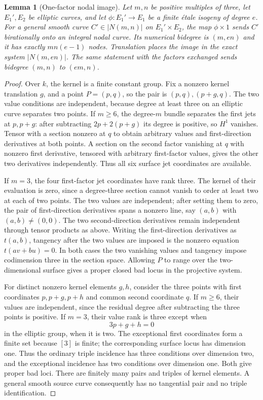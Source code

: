 \documentclass[11pt]{article}
\newtheorem{lemma}[theorem]{Lemma}
\theoremstyle{definition}\newtheorem{definition}[theorem]{Definition}
\theoremstyle{remark}\newtheorem{remark}[theorem]{Remark}
\begin{document}
\begin{lemma}[One-factor nodal image]\label{lem:axis}
Let $m,n$ be positive multiples of three, let $E_1',E_2$ be elliptic curves, and let $\phi:E_1'\to E_1$ be a finite \'etale isogeny of degree $e$. For a general smooth curve $C'\in|N(m,n)|$ on $E_1'\times E_2$, the map $\phi\times1$ sends $C'$ birationally onto an integral nodal curve. Its numerical bidegree is $(m,en)$ and it has exactly $mn(e-1)$ nodes. Translation places the image in the exact system $|N(m,en)|$. The same statement with the factors exchanged sends bidegree $(m,n)$ to $(em,n)$.
\end{lemma}
\begin{proof}
Over $k$, the kernel is a finite constant group. Fix a nonzero kernel translation $g$, and a point $P=(p,q)$, so the pair is $(p,q),(p+g,q)$. The two value conditions are independent, because degree at least three on an elliptic curve separates two points. If $m\ge6$, the degree-$m$ bundle separates the first jets at $p,p+g$: after subtracting $2p+2(p+g)$ its degree is positive, so $H^1$ vanishes. Tensor with a section nonzero at $q$ to obtain arbitrary values and first-direction derivatives at both points. A section on the second factor vanishing at $q$ with nonzero first derivative, tensored with arbitrary first-factor values, gives the other two derivatives independently. Thus all six surface jet coordinates are available.

If $m=3$, the four first-factor jet coordinates have rank three. The kernel of their evaluation is zero, since a degree-three section cannot vanish to order at least two at each of two points. The two values are independent; after setting them to zero, the pair of first-direction derivatives spans a nonzero line, say $(a,b)$ with $(a,b)\ne(0,0)$. The two second-direction derivatives remain independent through tensor products as above. Writing the first-direction derivatives as $t(a,b)$, tangency after the two values are imposed is the nonzero equation $t(av+bu)=0$. In both cases the two vanishing values and tangency impose codimension three in the section space. Allowing $P$ to range over the two-dimensional surface gives a proper closed bad locus in the projective system.

For distinct nonzero kernel elements $g,h$, consider the three points with first coordinates $p,p+g,p+h$ and common second coordinate $q$. If $m\ge6$, their values are independent, since the residual degree after subtracting the three points is positive. If $m=3$, their value rank is three except when
\[
                       3p+g+h=0
\]
in the elliptic group, when it is two. The exceptional first coordinates form a finite set because $[3]$ is finite; the corresponding surface locus has dimension one. Thus the ordinary triple incidence has three conditions over dimension two, and the exceptional incidence has two conditions over dimension one. Both give proper bad loci. There are finitely many pairs and triples of kernel elements. A general smooth source curve consequently has no tangential pair and no triple identification.


\end{proof}
\end{document}
